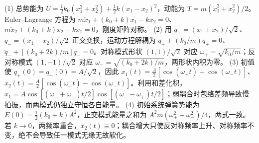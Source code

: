 (1) 总势能为 \(U=\frac12k_0(x_1^2+x_2^2)+\frac12k(x_1-x_2)^2\)，动能为 \(T=m(\dot x_1^2+\dot x_2^2)/2\)。Euler–Lagrange 方程为 \(m\ddot x_1+(k_0+k)x_1-kx_2=0\)、\(m\ddot x_2+(k_0+k)x_2-kx_1=0\)，刚度矩阵对称。
(2) 用 \(q_+=(x_1+x_2)/\sqrt2\)、\(q_-=(x_1-x_2)/\sqrt2\) 正交变换，运动方程解耦为 \(\ddot q_++(k_0/m)q_+=0\)、\(\ddot q_-+[(k_0+2k)/m]q_-=0\)。对称模式形状 \((1,1)/\sqrt2\) 对应 \(\omega_+=\sqrt{k_0/m}\)；反对称模式 \((1,-1)/\sqrt2\) 对应 \(\omega_-=\sqrt{(k_0+2k)/m}\)，两形状内积为零。
(3) 初值使 \(q_+(0)=q_-(0)=A/\sqrt2\)，因此 \(x_1(t)=\frac A2[\cos(\omega_+t)+\cos(\omega_-t)]\)、\(x_2(t)=\frac A2[\cos(\omega_+t)-\cos(\omega_-t)]\)。利用和差化积，\(x_1=A\cos[(\omega_-+\omega_+)t/2]\cos[(\omega_--\omega_+)t/2]\)；弱耦合时包络差频导致慢拍振，而两模式仍独立守恒各自能量。
(4) 初始系统弹簧势能为 \(E(0)=\frac12(k_0+k)A^2\)，正交模式能量之和为 \(A^2m(\omega_+^2+\omega_-^2)/4\)，两式一致。若 \(k\to0\)，两频率重合，\(x_2(t)\equiv0\)；耦合增大只使反对称频率上升、对称频率不变，绝不会导致任一模式无缘无故软化。
